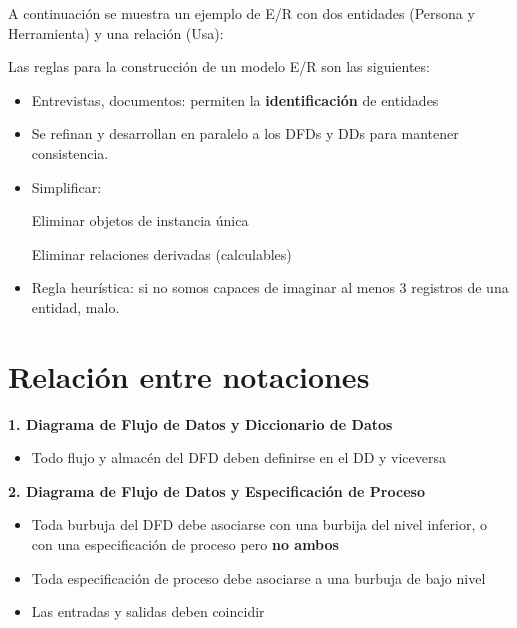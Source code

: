 A continuación se muestra un ejemplo de E/R con dos entidades
(Persona y Herramienta) y una relación (Usa):

\begin{center}
\end{center}

Las reglas para la construcción de un modelo E/R son las siguientes:

\begin{itemize}[noitemsep]
\item Entrevistas, documentos: permiten la \textbf{identificación} de entidades
\item Se refinan y desarrollan en paralelo a los DFDs y DDs para mantener consistencia.
\item Simplificar:

  Eliminar objetos de instancia única

  Eliminar relaciones derivadas (calculables)

\item Regla heurística: si no somos capaces de imaginar al menos 3 registros de una entidad, malo.
\end{itemize}

\section{Relación entre notaciones}

\textbf{1. Diagrama de Flujo de Datos y Diccionario de Datos}

\begin{itemize}[noitemsep]
\item Todo flujo y almacén del DFD deben definirse en el DD y viceversa
\end{itemize}

\textbf{2. Diagrama de Flujo de Datos y Especificación de Proceso}

\begin{itemize}[noitemsep]
\item Toda burbuja del DFD debe asociarse con una burbija del nivel inferior, o con una especificación de proceso pero \textbf{no ambos}
\item Toda especificación de proceso debe asociarse a una burbuja de bajo nivel
\item Las entradas y salidas deben coincidir
\end{itemize}

